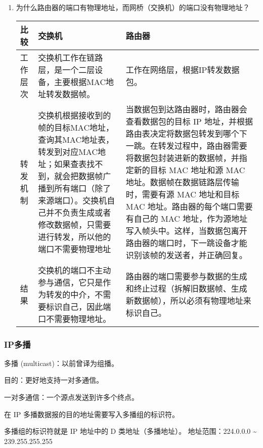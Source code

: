 \documentclass[11pt]{article}
\begin{document}
\begin{enumerate}
\begin{enumerate}
\begin{enumerate}
\begin{enumerate}
\begin{itemize}
\end{itemize}
\end{enumerate}
\item 为什么路由器的端口有物理地址，而网桥（交换机）的端口没有物理地址？
\label{sec:orgf45185b}
\begin{center}
\begin{tabular}{lll}
比较 & 交换机 & 路由器\\
\hline
工作层次 & 交换机工作在链路层，是一个二层设备，主要根据MAC地址转发数据帧。 & 工作在网络层，根据IP转发数据包。\\
转发机制 & 交换机根据接收到的帧的目标MAC地址，查询其MAC地址表，转发到对应MAC地址；如果查表找不到，就会把数据帧广播到所有端口（除了来源端口）。交换机自己并不负责生成或者修改数据帧，只需要进行转发，所以他的端口不需要物理地址 & 当数据包到达路由器时，路由器会查看数据包的目标 IP 地址，并根据路由表决定将数据包转发到哪个下一跳。在转发过程中，路由器需要将数据包封装进新的数据帧，并指定新的目标 MAC 地址和源 MAC 地址。数据帧在数据链路层传输时，需要有源 MAC 地址和目标 MAC 地址。路由器的每个端口需要有自己的 MAC 地址，作为源地址写入帧头中。这样，当数据包离开路由器的端口时，下一跳设备才能识别该帧的发送者，并正确回复。\\
结果 & 交换机的端口不主动参与通信，它只是作为转发的中介，不需要标识自己，因此端口不需要物理地址。 & 路由器的端口需要参与数据的生成和终止过程（拆解旧数据帧、生成新数据帧），所以必须有物理地址来标识自己。\\
\end{tabular}
\end{center}
\end{enumerate}
\end{enumerate}
\end{enumerate}
\subsubsection{IP多播}
\label{sec:org723725f}

多播 (multicast)：以前曾译为组播。

目的：更好地支持一对多通信。

一对多通信：一个源点发送到许多个终点。

在 IP 多播数据报的目的地址需要写入多播组的标识符。

多播组的标识符就是 IP 地址中的 D 类地址（多播地址）。
	地址范围：224.0.0.0 \textasciitilde{} 239.255.255.255
\end{document}
